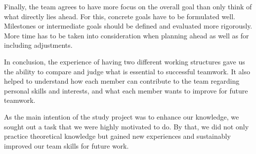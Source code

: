 Finally, the team agrees to have more focus on the overall goal than only think of what directly lies ahead. For this, concrete goals have to be formulated well. Milestones or intermediate goals should be defined and evaluated more rigorously. More time has to be taken into consideration when planning ahead as well as for including adjustments.

\bigskip
In conclusion, the experience of having two different working structures gave us the ability to compare and judge what is essential to successful teamwork. It also helped to understand how each member can contribute to the team regarding personal skills and interests, and what each member wants to improve for future teamwork.

As the main intention of the study project was to enhance our knowledge, we sought out a task that we were highly motivated to do. By that, we did not only practice theoretical knowledge but gained new experiences and sustainably improved our team skills for future work.